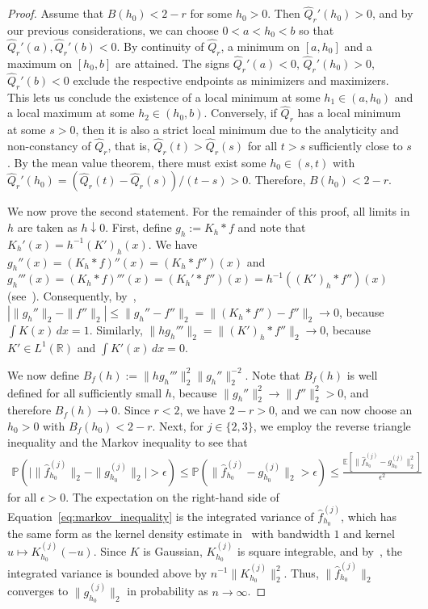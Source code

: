 \begin{proof}
    Assume that $B(h_0)<2-r$ for some $h_0>0$. Then $\hat{Q}_r'(h_0)>0$, and by our previous considerations, we can choose $0<a<h_0<b$ so that $\hat{Q}_r'(a),\hat{Q}_r'(b)<0$. By continuity of $\hat{Q}_r$, a minimum on $[a,h_0]$ and a maximum on $[h_0,b]$ are attained. The signs $\hat{Q}_r'(a)<0$, $\hat{Q}_r'(h_0)>0$, $\hat{Q}_r'(b)<0$ exclude the respective endpoints as minimizers and maximizers. This lets us conclude the existence of a local minimum at some $h_1\in(a,h_0)$ and a local maximum at some $h_2\in(h_0,b)$. Conversely, if $\hat{Q}_r$ has a local minimum at some $s>0$, then it is also a strict local minimum due to the analyticity and non-constancy of $\hat{Q}_r$, that is, $\hat{Q}_r(t)>\hat{Q}_r(s)$ for all $t>s$ sufficiently close to $s$. By the mean value theorem, there must exist some $h_0\in(s,t)$ with $\hat{Q}_r'(h_0)=(\hat{Q}_r(t)-\hat{Q}_r(s))/(t-s)>0$. Therefore, $B(h_0)<2-r$.

    We now prove the second statement. For the remainder of this proof, all limits in $h$ are taken as $h\downarrow0$. First, define $g_h:=K_h\ast f$ and note that $K_h'(x)=h^{-1}(K')_h(x)$. We have $g_h''(x)=(K_h\ast f)''(x)=(K_h\ast f'')(x)$ and $g_h'''(x)=(K_h\ast f)'''(x)=(K_h'\ast f'')(x)=h^{-1}((K')_h\ast f'')(x)$ (see~\cite[Theorem~7.19]{rudin_functional_1991}). Consequently, by~\cite[Theorem~8.14]{folland_real_1999}, $|\|g_h''\|_2-\|f''\|_2|\le\|g_h''-f''\|_2=\|(K_h\ast f'')-f''\|_2\to0$, because $\int K(x)\,dx=1$. Similarly, $\|hg_h'''\|_2=\|(K')_h\ast f''\|_2\to0$, because $K'\in L^1(\mathbb{R})$ and $\int K'(x)\,dx=0$.

    We now define $B_f(h):=\|hg_h'''\|_2^2\|g_h''\|_2^{-2}$. Note that $B_f(h)$ is well defined for all sufficiently small $h$, because $\|g_h''\|_2^2\to\|f''\|_2^2>0$, and therefore $B_f(h)\to0$. Since $r<2$, we have $2-r>0$, and we can now choose an $h_0>0$ with $B_f(h_0)<2-r$. Next, for $j\in\{2,3\}$, we employ the reverse triangle inequality and the Markov inequality to see that
    \begin{align}\label{eq:markov_inequality}
        \mathbb{P}\left(\big|\|\hat{f}_{h_0}^{(j)}\|_2-\|g_{h_0}^{(j)}\|_2\big|>\epsilon\right)\le\mathbb{P}\left(\|\hat{f}_{h_0}^{(j)}-g_{h_0}^{(j)}\|_2>\epsilon\right)\le\frac{\mathbb{E}[\|\hat{f}_{h_0}^{(j)}-g_{h_0}^{(j)}\|_2^2]}{\epsilon^2}
    \end{align}
    for all $\epsilon>0$. The expectation on the right-hand side of Equation~\eqref{eq:markov_inequality} is the integrated variance of $\hat{f}_{h_0}^{(j)}$, which has the same form as the kernel density estimate in~\cite[Equation~(1.2)]{tsybakov2009introduction} with bandwidth $1$ and kernel $u\mapsto K_{h_0}^{(j)}(-u)$. Since $K$ is Gaussian, $K_{h_0}^{(j)}$ is square integrable, and by~\cite[Proposition~1.4]{tsybakov2009introduction}, the integrated variance is bounded above by $n^{-1}\|K_{h_0}^{(j)}\|_2^2$. Thus, $\|\hat{f}_{h_0}^{(j)}\|_2$ converges to $\|g_{h_0}^{(j)}\|_2$ in probability as $n\to\infty$.


\end{proof}
